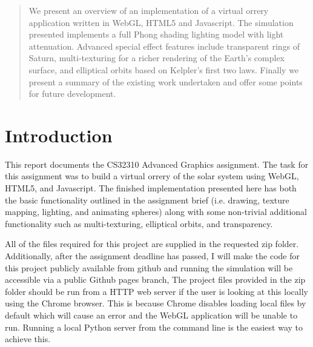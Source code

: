 \documentclass[conference]{IEEEtran}
\begin{document}




%
\IEEEpeerreviewmaketitle

\begin{abstract}
We present an overview of an implementation of a virtual orrery application written in WebGL, HTML5 and Javascript. The simulation presented implements a full Phong shading lighting model with light attenuation. Advanced special effect features include transparent rings of Saturn, multi-texturing for a richer rendering of the Earth's complex surface, and elliptical orbits based on Kelpler's first two laws. Finally we present a summary of the existing work undertaken and offer some points for future development.
\end{abstract}

\section{Introduction}
This report documents the CS32310 Advanced Graphics assignment. The task for this assignment was to build a virtual orrery of the solar system using WebGL, HTML5, and Javascript. The finished implementation presented here has both the basic functionality outlined in the assignment brief (i.e. drawing, texture mapping, lighting, and animating spheres) along with some non-trivial additional functionality such as multi-texturing, elliptical orbits, and transparency. 

All of the files required for this project are supplied in the requested zip folder. Additionally, after the assignment deadline has passed, I will make the code for this project publicly available from github \cite{github} and running the simulation will be accessible via a public Github pages branch, The project files provided in the zip folder should be run from a HTTP web server if the user is looking at this locally using the Chrome browser. This is because Chrome disables loading local files by default which will cause an error and the WebGL application will be unable to run. Running a local Python server from the command line is the easiest way to achieve this.
\end{document}
